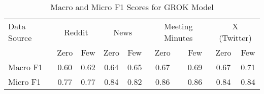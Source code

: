 \begin{table}[htbp]
\centering
\begin{tabular}{l *{8}{c}}
\toprule
Data Source & \multicolumn{2}{c}{Reddit} & \multicolumn{2}{c}{News} & \multicolumn{2}{c}{Meeting Minutes} & \multicolumn{2}{c}{X (Twitter)} \\
& Zero & Few & Zero & Few & Zero & Few & Zero & Few \\
\midrule
Macro F1 & 0.60 & 0.62 & 0.64 & 0.65 & 0.67 & 0.69 & 0.67 & 0.71 \\
Micro F1 & 0.77 & 0.77 & 0.84 & 0.82 & 0.86 & 0.86 & 0.84 & 0.84 \\
\bottomrule
\end{tabular}
\caption{Macro and Micro F1 Scores for GROK Model}
\label{tab:grok_macro_micro}
\end{table}